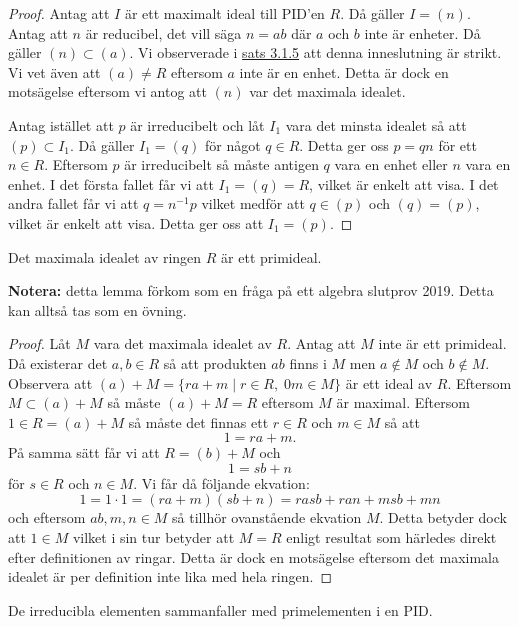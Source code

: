 \documentclass{article}
\theoremstyle{definition}
\begin{document}
\begin{proof}
  Antag att $I$ är ett maximalt ideal till PID'en $R$. Då gäller $I = (n)$. Antag att $n$ är reducibel, det vill säga 
  $n = ab$ där $a$ och $b$ inte är enheter. Då gäller $(n) \subset (a)$. Vi observerade i \hyperlink{inv}{sats 3.1.5} att denna inneslutning är strikt.
  Vi vet även att $(a) \neq R$ eftersom $a$ inte är en enhet. Detta är dock en motsägelse eftersom vi antog att $(n)$ var det maximala idealet.

  Antag istället att $p$ är irreducibelt och låt $I_1$ vara det minsta idealet så att $(p) \subset I_1$. Då gäller $I_1 = (q)$ för något $q \in R$. 
  Detta ger oss $p = qn$ för ett $n \in R$. Eftersom $p$ är irreducibelt så måste antigen $q$ vara en enhet eller $n$ vara en enhet. 
  I det första fallet får vi att $I_1 = (q) = R$, vilket är enkelt att visa. I det andra fallet får vi att $q = n^{-1}p$ vilket medför att 
  $q \in (p)$ och $(q) = (p)$, vilket är enkelt att visa. Detta ger oss att $I_1 = (p)$.
\end{proof}

\hypertarget{maxprim}{}
\begin{mylemma}{}{}
  Det maximala idealet av ringen $R$ är ett primideal.
\end{mylemma}
\textbf{Notera:} detta lemma förkom som en fråga på ett algebra slutprov 2019. Detta kan alltså tas som en övning. 
\begin{proof}
  Låt $M$ vara det maximala idealet av $R$. Antag att $M$ inte är ett primideal. Då existerar det $a, b \in R$ så att produkten 
  $ab$ finns i $M$ men $a \notin M$ och $b \notin M$. Observera att $(a) + M = \{ra + m \; | \; r \in R, \; 0m \in M\}$ är ett ideal av $R$. 
  Eftersom $M \subset (a) + M$ så måste $(a) + M = R$ eftersom $M$ är maximal. Eftersom $1 \in R = (a) + M$ så måste det finnas ett 
  $r \in R$ och $m \in M$ så att 
  \[1 = ra + m.\]
  På samma sätt får vi att $R = (b) + M$ och
  \[ 1 =  sb + n\]
  för $s \in R$ och $n \in M$. 
  Vi får då följande ekvation: 
  \[1 = 1 \cdot 1 = (ra + m)(sb + n) = rasb + ran + msb + mn\]
  och eftersom $ab, m, n \in M$ så tillhör ovanstående ekvation $M$. Detta betyder dock att $1 \in M$ vilket i sin tur betyder 
  att $M = R$ enligt resultat som härledes direkt efter definitionen av ringar. Detta är dock en motsägelse eftersom 
  det maximala idealet är per definition inte lika med hela ringen.
\end{proof}

\hypertarget{irprim}{}
\begin{mylemma}{}{}
  De irreducibla elementen sammanfaller med primelementen i en PID.
\end{mylemma}
\end{document}
